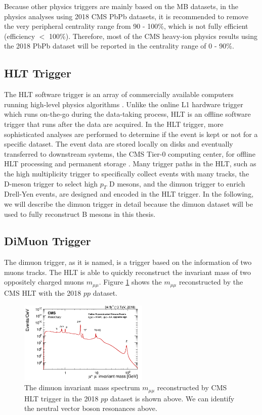 Because other physics triggers are mainly based on the MB datasets, in the physics analyses using 2018 CMS PbPb datasets, it is recommended to remove the very peripheral centrality range from 90 - 100\%, which is not fully efficient (efficiency $<$ 100\%). Therefore, most of the CMS heavy-ion physics results using the 2018 PbPb dataset will be reported in the centrality range of 0 - 90\%.

\subsection{HLT Trigger}

The HLT software trigger is an array of commercially available computers running high-level physics algorithms \cite{CMSTrigger}. Unlike the online L1 hardware trigger which runs on-the-go during the data-taking process, HLT is an offline software trigger that runs after the data are acquired. In the HLT trigger, more sophisticated analyses are performed to determine if the event is kept or not for a specific dataset. The event data are stored locally on disks and eventually transferred to downstream systems, the CMS Tier-0 computing center, for offline HLT processing and permanent storage \cite{CMSTrigger}. Many trigger paths in the HLT, such as the high multiplicity trigger to specifically collect events with many tracks, the D-meson trigger to select high $p_T$ D mesons, and the dimuon trigger to enrich Drell-Yen events, are designed and encoded in the HLT trigger. In the following, we will describe the dimuon trigger in detail because the dimuon dataset will be used to fully reconstruct B mesons in this thesis. 

\subsection{DiMuon Trigger}

The dimuon trigger, as it is named, is a trigger based on the information of two muons tracks. The HLT is able to quickly reconstruct the invariant mass of two oppositely charged muons $m_{\mu\mu}$. Figure \ref{DimuonInvMass} shows the $m_{\mu\mu}$ reconstructed by the CMS HLT with the 2018 $pp$ dataset.

\begin{figure}[hbtp]
\begin{center}
\includegraphics[width=0.55\textwidth]{Figures/Chapter3/DimuonInvMass.png}
\caption{The dimuon invariant mass spectrum $m_{\mu\mu}$ reconstructed by CMS HLT trigger in the 2018 $pp$ dataset is shown above. We can identify the neutral vector boson resonances above.}
\label{DimuonInvMass}
\end{center}
\end{figure} 



